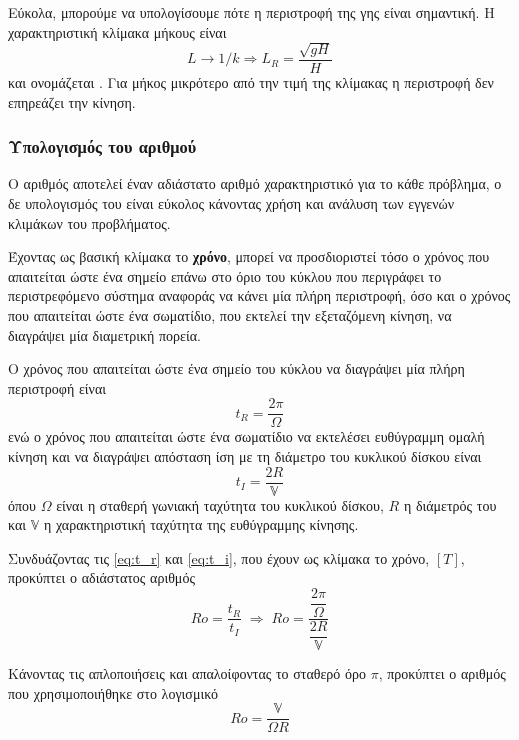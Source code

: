 Εύκολα, μπορούμε να υπολογίσουμε πότε η περιστροφή της γης είναι σημαντική. Η χαρακτηριστική κλίμακα μήκους είναι
\begin{equation}
	L \rightarrow 1/k \Rightarrow L_R = \dfrac{\sqrt{gH}}{H}
\end{equation}
και ονομάζεται \textbf{}. Για μήκος μικρότερο από την τιμή της κλίμακας η περιστροφή δεν επηρεάζει την κίνηση.

\subsubsection{Υπολογισμός του αριθμού \ros}
Ο αριθμός \ros αποτελεί έναν αδιάστατο αριθμό χαρακτηριστικό για το κάθε πρόβλημα, ο δε υπολογισμός του είναι εύκολος κάνοντας χρήση και ανάλυση των εγγενών κλιμάκων του προβλήματος.

Έχοντας ως βασική κλίμακα το \textbf{χρόνο}, μπορεί να προσδιοριστεί τόσο ο χρόνος που απαιτείται ώστε ένα σημείο επάνω στο όριο του κύκλου που περιγράφει το περιστρεφόμενο σύστημα αναφοράς να κάνει μία πλήρη περιστροφή, όσο και ο χρόνος που απαιτείται ώστε ένα σωματίδιο, που εκτελεί την εξεταζόμενη κίνηση, να διαγράψει μία διαμετρική πορεία.

Ο χρόνος που απαιτείται ώστε ένα σημείο του κύκλου να διαγράψει μία πλήρη περιστροφή είναι
\begin{equation}
\label{eq:t_r}
t_{R}=\frac{2\pi}{\Omega}
\end{equation}
ενώ ο χρόνος που απαιτείται ώστε ένα σωματίδιο να εκτελέσει ευθύγραμμη ομαλή κίνηση και να διαγράψει απόσταση ίση με τη διάμετρο του κυκλικού δίσκου είναι
\begin{equation}
\label{eq:t_i}
t_{I}=\frac{2R}{\mathbb{V}}
\end{equation}
όπου $Ω$ είναι η σταθερή γωνιακή ταχύτητα του κυκλικού δίσκου, $R$ η διάμετρός του και $\mathbb{V}$ η χαρακτηριστική ταχύτητα της ευθύγραμμης κίνησης.

Συνδυάζοντας τις \ref{eq:t_r} και \ref{eq:t_i}, που έχουν ως κλίμακα το χρόνο, $[T]$, προκύπτει ο αδιάστατος αριθμός \ros
\begin{equation}
\label{eq:ro}
Ro = \dfrac{t_{R}}{t_{I}} \; \Rightarrow \;
Ro = \dfrac{\dfrac{2π}{Ω}}{\dfrac{2R}{\mathbb{V}}}
\end{equation}

Κάνοντας τις απλοποιήσεις και απαλοίφοντας το σταθερό όρο $π$, προκύπτει ο αριθμός \ros που χρησιμοποιήθηκε στο λογισμικό
\begin{equation}
Ro = \dfrac{\mathbb{V}}{ΩR}
\end{equation}